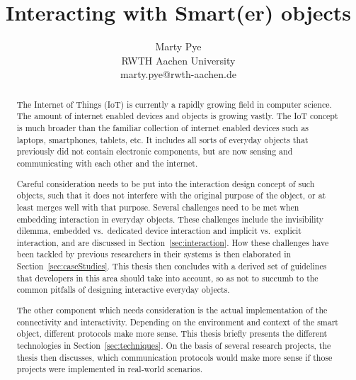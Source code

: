 \documentclass{acm_proc_article-sp}
\begin{document}
\title{Interacting with Smart(er) objects}

\author{Marty Pye\\ RWTH Aachen University\\ marty.pye@rwth-aachen.de}

\maketitle
\begin{abstract}
The Internet of Things (IoT) is currently a rapidly growing field in computer science.
The amount of internet enabled devices and objects is growing vastly. 
The IoT concept is much broader than the familiar collection of internet enabled devices such as laptops, smartphones, tablets, etc.
It includes all sorts of everyday objects that previously did not contain electronic components, but are now sensing and communicating with each other and the internet.

Careful consideration needs to be put into the interaction design concept of such objects, such that it does not interfere with the original purpose of the object, or at least merges well with that purpose.
Several challenges need to be met when embedding interaction in everyday objects.
These challenges include the invisibility dilemma, embedded vs.\ dedicated device interaction and implicit vs.\ explicit interaction, and are discussed in Section~\ref{sec:interaction}.
How these challenges have been tackled by previous researchers in their systems is then elaborated in Section~\ref{sec:caseStudies}. 
This thesis then concludes with a derived set of guidelines that developers in this area should take into account, so as not to succumb to the common pitfalls of designing interactive everyday objects.

The other component which needs consideration is the actual implementation of the connectivity and interactivity. Depending on the environment and context of the smart object, different protocols make more sense.
This thesis briefly presents the different technologies in Section~\ref{sec:techniques}.
On the basis of several research projects, the thesis then discusses, which communication protocols would make more sense if those projects were implemented in real-world scenarios.
\end{abstract}
\end{document}
